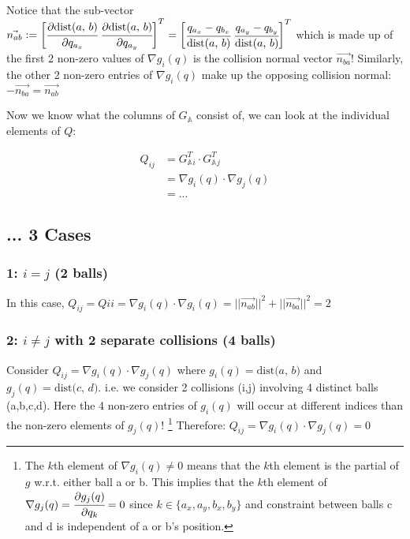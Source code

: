\documentclass[12pt]{article}
\newcommand{\GA}{G_{\mathbb{A}}}
\newcommand{\pd}[2]{\cfrac{\partial{#1}}{\partial{#2}}}
\newcommand{\dist}[2]{\text{dist(} #1 \text{, } #2 \text{)}}
\begin{document}
Notice that the sub-vector
$\vec{n_{ab}}
    := \begin{bmatrix}
        \pd{\dist{a}{b}}{q_{a_x}} \; \pd{\dist{a}{b}}{q_{a_y}}
    \end{bmatrix}^T
    = \begin{bmatrix}
        \cfrac{q_{a_x} - q_{b_x}}{\dist{a}{b}} \; \cfrac{q_{a_y} - q_{b_y}}{\dist{a}{b}}
    \end{bmatrix}^T$
which is made up of the first 2 non-zero values of $\nabla g_i(q)$
is the collision normal vector $\vec{n_{ba}}$!
Similarly, the other 2 non-zero entries of $\nabla g_i(q)$ make up the opposing 
collision normal: $-\vec{n_{ba}} = \vec{n_{ab}}$

Now we know what the columns of $\GA$ consist of, we can look at the individual elements of $Q$:

\begin{align*}
Q_{ij}
    &= \GA^T{_i} \cdot \GA^T{_j}\\
    &= \nabla g_i(q) \cdot \nabla g_j(q)\\
    &= ...
\end{align*}

\subsection*{... 3 Cases} 
\subsubsection*{1: $i = j$ (2 balls)} 

In this case, $Q_{ij} = Q{ii} = \nabla g_i(q) \cdot \nabla g_i(q) = ||\vec{n_{ab}}||^2 + ||\vec{n_{ba}}||^2 = 2$

\subsubsection*{2: $i \neq j$ with 2 separate collisions (4 balls)}

Consider $Q_{ij} = \nabla g_i(q) \cdot \nabla g_j(q)$
where $g_i(q) = \dist{a}{b}$ and $g_j(q) = \dist{c}{d}$. 
i.e. we consider 2 collisions (i,j) involving 4 distinct balls (a,b,c,d).
Here the 4 non-zero entries of
$g_i(q)$ will occur at different indices than the non-zero elements of $g_j(q)$!
\footnote{The $k$th element of $\nabla g_i(q) \neq 0$ means that the $k$th element
is the partial of $g$ w.r.t. either ball a or b. This implies that the $k$th element
of $\nabla g_j(q) = \pd{g_j(q)}{q_k} = 0$ since $k \in \{a_x, a_y, b_x, b_y\}$ and constraint between balls c and d is independent
of a or b's position.}
Therefore: $Q_{ij} = \nabla g_i(q) \cdot \nabla g_j(q) = 0$
\end{document}
